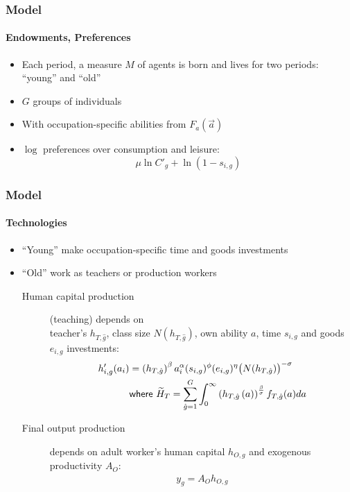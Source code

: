 \documentclass[11pt]{beamer}
\begin{document}
	\begin{frame}
		\frametitle{Model}
		\framesubtitle{Endowments, Preferences}
		\begin{itemize}
			\item Each period, a measure $M$ of agents is born and lives for two periods: ``young'' and ``old''
			\item $G$ groups of individuals
			\item With occupation-specific abilities from $F_a(\vec{a})$
			\item $\log$ preferences over consumption and leisure:
			\begin{displaymath}
				\mu \ln C'_{g} + \ln\left(1-s_{i,g} \right)
			\end{displaymath}
		\end{itemize}
	\end{frame}
	
	\begin{frame}
		\frametitle{Model}
		\framesubtitle{Technologies}
		\begin{itemize}
			\item ``Young'' make occupation-specific time and goods investments
			\item ``Old'' work as \alert{teachers} or \alert{production workers}
			\begin{description}
				\item[Human capital production] (teaching) depends on\\
				teacher's $h_{T,\hat{g}}$, class size $N(h_{T,\hat{g}})$,  own ability $a$, time $s_{i,g}$ and goods $e_{i,g}$ investments:
				\begin{align*}
					\label{}
					h'_{i,g}(a_i) & =\left( h_{T,\hat{g}}\right)^\beta a_i^\alpha(s_{i,g})^{\phi} (e_{i,g})^{\eta}\big(N(h_{T,\hat{g}})\big)^{-\sigma}\\
					& \textrm{{\sf where }} \widetilde{H}_T =\sum_{\hat{g}=1}^G \int_0^\infty \left( h_{T,\hat{g}}\left( a \right) \right)^{\frac{\beta}{\sigma}} f_{T,\hat{g}}(a) da
				\end{align*}
				\item[Final output production] depends on adult worker's human capital $h_{O,g}$ and exogenous productivity $A_O$:
				\begin{align*}
					\label{}
					y_g = A_O h_{O,g}
				\end{align*}
			\end{description}
		\end{itemize}
	\end{frame}
	
\end{document}
